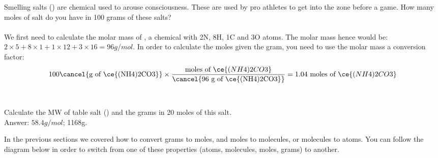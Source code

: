 \documentclass[main.tex]{subfiles}
\begin{document}
\begin{description}
\begin{example} %
Smelling salts () are chemical used to arouse consciousness. These are used by pro athletes to get into the zone before a game.  How many moles of salt do you have in 100 grams of these salts? \\
\\
We first need to calculate the molar mass of , a chemical with 2N, 8H, 1C and 3O atoms. The molar mass hence would be: $2\times 5+8\times 1+1\times 12 + 3\times 16=96g/mol$. In order to calculate the moles given the gram, you need to use the molar mass a conversion factor:
 \begin{equation*}
100  \cancel{\text{g of \ce{(NH4)2CO3}}} \times 
\dfrac{\text{moles of }\ce{(NH4)2CO3} } { \cancel{96\text{ g of \ce{(NH4)2CO3}}} } 
=\text{1.04 moles of }\ce{(NH4)2CO3}
\end{equation*}\\
\faDiamond\ \\
Calculate the MW of table salt () and the grams in 20 moles of this salt. \\
\flushright Answer: $58.4g/mol$; 1168g.
\end{example}%


\item[\docfilehook{From grams to atoms}{From grams to atoms}] In the previous sections we covered how to convert grams to moles, and moles to molecules, or molecules to atoms. You can follow the diagram below in order to switch from one of these properties (atoms, molecules, moles, grams) to another.\\

\end{description}
\end{document}
